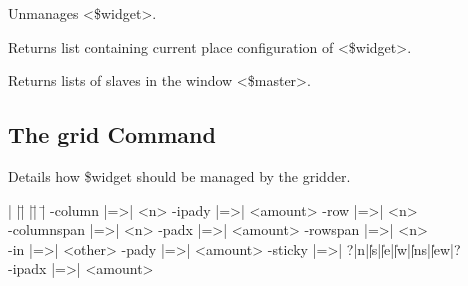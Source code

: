 \begin{enum}{1cm}

Unmanages <\$widget>.

Returns list containing current place configuration of <\$widget>.

Returns lists of slaves in the window <\$master>.

\end{enum}

\subsection*{The grid Command}
\vspace{-4pt}
\begin{enum}{1cm}

Details how \$widget should be managed by the gridder.

\end{enum}

\begin{tabbing}
|  |\=|               |\=|              |\= \kill
 \> -column |=>| <n>    	\> -ipady |=>| <amount> \> -row |=>| <n> \\
 \> -columnspan |=>| <n>	\> -padx |=>| <amount>  \> -rowspan |=>| <n> \\
 \> -in |=>| <other>		\> -pady |=>| <amount>  \> -sticky |=>| ?|n|\||s|\||e|\||w|\||ns|\||ew|? \\
 \> -ipadx |=>| <amount>	\> \\
\end{tabbing}

